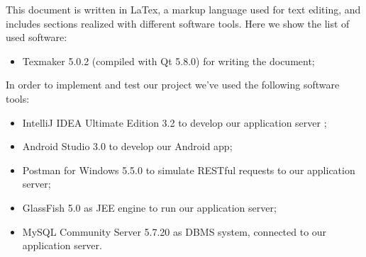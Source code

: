 This document is written in LaTex, a markup language used for text editing, and includes sections realized with different software tools. Here we show the list of used software:
\begin{itemize}
	\item Texmaker 5.0.2 (compiled with Qt 5.8.0) for writing the document;
\end{itemize}
In order to implement and test our project we've used the following software tools:
\begin{itemize}
	\item IntelliJ IDEA Ultimate Edition 3.2 to develop our application server ;
	\item Android Studio 3.0 to develop our Android app;
	\item Postman for Windows 5.5.0 to simulate RESTful requests to our application server;
	\item GlassFish 5.0 as JEE engine to run our application server;
	\item MySQL Community Server 5.7.20 as DBMS system, connected to our application server.
\end{itemize}